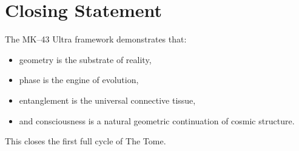 \section{Closing Statement}
The MK--43 Ultra framework demonstrates that:
\begin{itemize}
  \item geometry is the substrate of reality,
  \item phase is the engine of evolution,
  \item entanglement is the universal connective tissue,
  \item and consciousness is a natural geometric continuation of cosmic structure.
\end{itemize}
This closes the first full cycle of The Tome.
